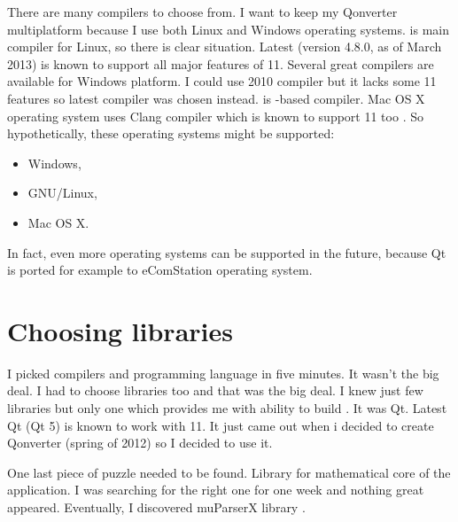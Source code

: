 There are many \cpp{} compilers to choose from. I want to keep my Qonverter multiplatform because I use both Linux and Windows operating systems.  is main compiler for Linux, so there is clear situation. Latest  (version 4.8.0, as of March 2013) is known to support all major features of \cpp{} 11. Several great compilers are available for Windows platform. I could use  2010 compiler but it lacks some \cpp{} 11 features so latest  compiler was chosen instead.  is -based compiler. Mac OS X operating system uses Clang compiler which is known to support \cpp{} 11 too \citep{various:clang}. So hypothetically, these operating systems might be supported:
\begin{itemize}
\item Windows,
\item GNU/Linux,
\item Mac OS X.
\end{itemize}
In fact, even more operating systems can be supported in the future, because Qt is ported for example to eComStation \citep{various:ecomstation} operating system.


\section{Choosing libraries}
I picked compilers and programming language in five minutes. It wasn't the big deal. I had to choose libraries too and that was the big deal. I knew just few libraries but only one which provides me with ability to build . It was Qt. Latest Qt (Qt 5) is known to work with \cpp{} 11. It just came out when i decided to create Qonverter (spring of 2012) so I decided to use it.

One last piece of puzzle needed to be found. Library for mathematical core of the application. I was searching for the right one for one week and nothing great appeared. Eventually, I discovered muParserX library \citep{various:muparserx}.